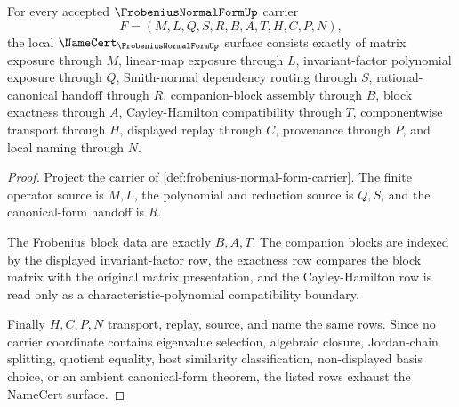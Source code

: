 \begin{theorem}
\label{thm:frobenius-normal-form-namecert-obligations}
For every accepted $\FrobeniusNormalFormUp$ carrier
$$
F=(M,L,Q,S,R,B,A,T,H,C,P,N),
$$
the local $\NameCert_{\FrobeniusNormalFormUp}$ surface consists exactly of matrix exposure through $M$, linear-map exposure through $L$, invariant-factor polynomial exposure through $Q$, Smith-normal dependency routing through $S$, rational-canonical handoff through $R$, companion-block assembly through $B$, block exactness through $A$, Cayley-Hamilton compatibility through $T$, componentwise transport through $H$, displayed replay through $C$, provenance through $P$, and local naming through $N$.
\end{theorem}
\begin{proof}
Project the carrier of \autoref{def:frobenius-normal-form-carrier}. The finite operator source is $M,L$, the polynomial and reduction source is $Q,S$, and the canonical-form handoff is $R$.

The Frobenius block data are exactly $B,A,T$. The companion blocks are indexed by the displayed invariant-factor row, the exactness row compares the block matrix with the original matrix presentation, and the Cayley-Hamilton row is read only as a characteristic-polynomial compatibility boundary.

Finally $H,C,P,N$ transport, replay, source, and name the same rows. Since no carrier coordinate contains eigenvalue selection, algebraic closure, Jordan-chain splitting, quotient equality, host similarity classification, non-displayed basis choice, or an ambient canonical-form theorem, the listed rows exhaust the NameCert surface.
\end{proof}

